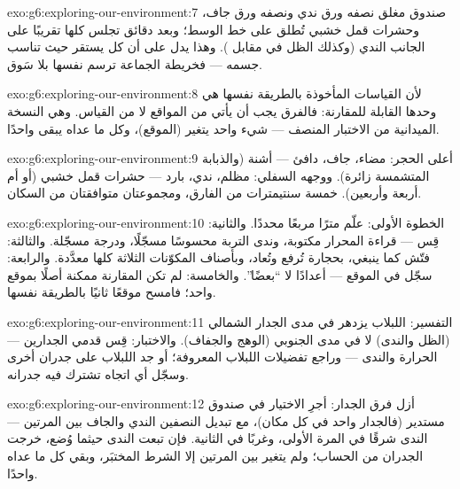\begin{solution}{exo:g6:exploring-our-environment:7}
صندوق مغلق نصفه ورق ندي ونصفه ورق جاف، وحشرات قمل خشبي تُطلق على
خط الوسط؛ وبعد دقائق تجلس كلها تقريبًا على الجانب الندي (وكذلك
الظل في مقابل ). وهذا يدل على أن كل  يستقر حيث تناسب
 جسمه --- فخريطة الجماعة ترسم نفسها بلا سَوق.
\end{solution}

\begin{solution}{exo:g6:exploring-our-environment:8}
لأن القياسات المأخوذة بالطريقة نفسها هي وحدها القابلة للمقارنة:
فالفرق يجب أن يأتي من المواقع لا من القياس. وهي النسخة الميدانية
من الاختبار المنصف --- شيء واحد يتغير (الموقع)، وكل ما عداه يبقى
واحدًا.
\end{solution}

\begin{solution}{exo:g6:exploring-our-environment:9}
أعلى الحجر: مضاء، جاف، دافئ --- أشنة (والذبابة المتشمسة زائرة).
ووجهه السفلي: مظلم، ندي، بارد --- حشرات قمل خشبي (أو أم أربعة
وأربعين). خمسة سنتيمترات من الفارق، ومجموعتان متوافقتان من
السكان.
\end{solution}

\begin{solution}{exo:g6:exploring-our-environment:10}
الخطوة الأولى: علّم مترًا مربعًا محددًا. والثانية: قِس --- قراءة
المحرار مكتوبة، وندى التربة محسوسًا مسجّلًا، ودرجة  مسجّلة.
والثالثة: فتّش كما ينبغي، بحجارة تُرفع وتُعاد، وبأصناف المكوّنات
الثلاثة كلها معدَّدة. والرابعة: سجّل في الموقع --- أعدادًا لا
``بعضًا''. والخامسة: لم تكن المقارنة ممكنة أصلًا بموقع واحد؛ فامسح
موقعًا ثانيًا بالطريقة نفسها.
\end{solution}

\begin{solution}{exo:g6:exploring-our-environment:11}
التفسير: اللبلاب يزدهر في مدى  الجدار الشمالي (الظل والندى) لا
في مدى  الجنوبي (الوهج والجفاف). والاختبار: قِس قدمي الجدارين
--- الحرارة والندى  --- وراجع تفضيلات اللبلاب المعروفة؛ أو
جد اللبلاب على جدران أخرى وسجّل أي اتجاه تشترك فيه جدرانه.
\end{solution}

\begin{solution}{exo:g6:exploring-our-environment:12}
أزل فرق الجدار: أجرِ الاختيار في صندوق مستدير (فالجدار واحد في كل
مكان)، مع تبديل النصفين الندي والجاف بين المرتين --- الندى شرقًا في
المرة الأولى، وغربًا في الثانية. فإن تبعت  الندى حيثما
وُضع، خرجت الجدران من الحساب؛ ولم يتغير بين المرتين إلا الشرط
المختبَر، وبقي كل ما عداه واحدًا.
\end{solution}


